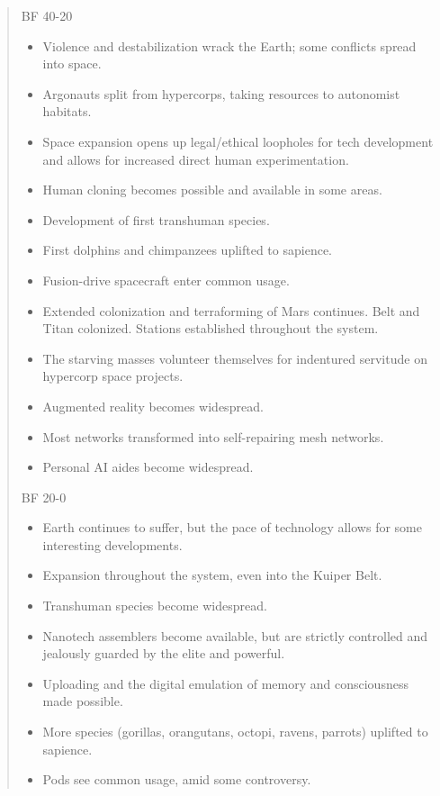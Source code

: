 \begin{quote}
   BF 40-20
   \begin{itemize}
      \item Violence and destabilization wrack the Earth; some conflicts
         spread into space.
      \item Argonauts split from hypercorps, taking resources to autonomist
         habitats.
      \item Space expansion opens up legal/ethical loopholes for tech
         development and allows for increased direct human experimentation.
      \item Human cloning becomes possible and available in some areas.
      \item Development of first transhuman species.
      \item First dolphins and chimpanzees uplifted to sapience.
      \item Fusion-drive spacecraft enter common usage.
      \item Extended colonization and terraforming of Mars continues. Belt and
         Titan colonized. Stations established throughout the system.
      \item The starving masses volunteer themselves for indentured servitude
         on hypercorp space projects.
      \item Augmented reality becomes widespread.
      \item Most networks transformed into self-repairing mesh networks.
      \item Personal AI aides become widespread.
   \end{itemize}


   BF 20-0
   \begin{itemize}
      \item Earth continues to suffer, but the pace of technology allows
         for some interesting developments.
      \item Expansion throughout the system, even into the Kuiper Belt.
      \item Transhuman species become widespread.
      \item Nanotech assemblers become available, but are strictly controlled
         and jealously guarded by the elite and powerful.
      \item Uploading and the digital emulation of memory and consciousness
         made possible.
      \item More species (gorillas, orangutans, octopi, ravens, parrots)
         uplifted to sapience.
      \item Pods see common usage, amid some controversy.
   \end{itemize}



\end{quote}
